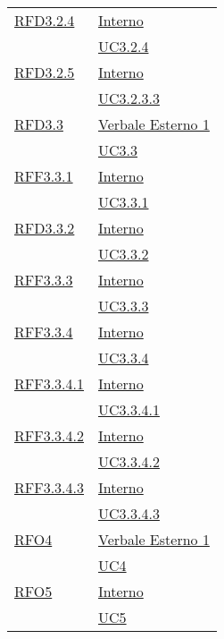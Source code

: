 \begin{longtable}{|>{\centering}m{5cm}|m{5cm}<{\centering}|}
\hyperlink{RFD3.2.4}{RFD3.2.4} & \hyperlink{Interno}{Interno}\\
& \hyperref[UC3.2.4]{UC3.2.4}\\ \hline

\hyperlink{RFD3.2.5}{RFD3.2.5} & \hyperlink{Interno}{Interno}\\
& \hyperref[UC3.2.3.3]{UC3.2.3.3}\\ \hline

\hyperlink{RFD3.3}{RFD3.3} & \hyperlink{Verbale Esterno 1}{Verbale Esterno 1}\\
& \hyperref[UC3.3]{UC3.3}\\ \hline

\hyperlink{RFF3.3.1}{RFF3.3.1} & \hyperlink{Interno}{Interno}\\
& \hyperref[UC3.3.1]{UC3.3.1}\\ \hline

\hyperlink{RFD3.3.2}{RFD3.3.2} & \hyperlink{Interno}{Interno}\\
& \hyperref[UC3.3.2]{UC3.3.2}\\ \hline

\hyperlink{RFF3.3.3}{RFF3.3.3} & \hyperlink{Interno}{Interno}\\
& \hyperref[UC3.3.3]{UC3.3.3}\\ \hline

\hyperlink{RFF3.3.4}{RFF3.3.4} & \hyperlink{Interno}{Interno}\\
& \hyperref[UC3.3.4]{UC3.3.4}\\ \hline

\hyperlink{RFF3.3.4.1}{RFF3.3.4.1} & \hyperlink{Interno}{Interno}\\
& \hyperref[UC3.3.4.1]{UC3.3.4.1}\\ \hline

\hyperlink{RFF3.3.4.2}{RFF3.3.4.2} & \hyperlink{Interno}{Interno}\\
& \hyperref[UC3.3.4.2]{UC3.3.4.2}\\ \hline

\hyperlink{RFF3.3.4.3}{RFF3.3.4.3} & \hyperlink{Interno}{Interno}\\
& \hyperref[UC3.3.4.3]{UC3.3.4.3}\\ \hline

\hyperlink{RFO4}{RFO4} & \hyperlink{Verbale Esterno 1}{Verbale Esterno 1}\\
& \hyperref[UC4]{UC4}\\ \hline

\hyperlink{RFO5}{RFO5} & \hyperlink{Interno}{Interno}\\
& \hyperref[UC5]{UC5}\\ \hline


\end{longtable}
